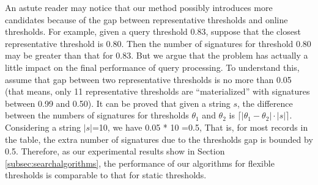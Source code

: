 An astute reader may notice that our method possibly introduces more candidates because of the gap between representative thresholds and online thresholds. For example, given a query threshold 0.83, suppose that the closest representative threshold is 0.80. Then  the number of signatures for threshold 0.80  may be greater than that for 0.83. But we argue that the problem  has actually a little impact on the final performance of query processing. To understand this, assume that gap between two representative thresholds is no more than 0.05 (that means, only 11 representative thresholds are ``materialized'' with signatures between 0.99 and 0.50). It can be proved that given a string $s$, the difference between the numbers of signatures for thresholds $\theta_1$ and $\theta_2$ is $\lceil  |\theta_1 - \theta_2|   \cdot |s| \rceil$. Considering a string $|s|$=10, we have 0.05 * 10 =0.5, That is, for most records in the table, the extra number of signatures due to the thresholds gap  is bounded by 0.5. Therefore, as our experimental results show in Section \ref{subsec:searchalgorithms}, the performance of our algorithms for flexible thresholds is comparable to that for static thresholds.



